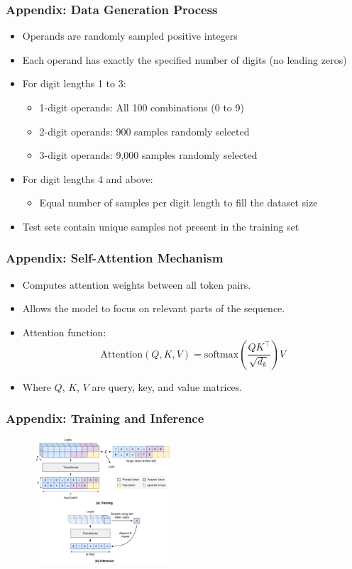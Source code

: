 \documentclass[14pt,aspectratio=169]{beamer}
\theoremstyle{remark}
\begin{document}
\begin{frame}
    \frametitle{Appendix: Data Generation Process}
    \begin{itemize}
        \item Operands are randomly sampled positive integers
        \item Each operand has exactly the specified number of digits (no leading zeros)
        \item For digit lengths 1 to 3:
              \begin{itemize}
                  \item 1-digit operands: All 100 combinations (0 to 9)
                  \item 2-digit operands: 900 samples randomly selected
                  \item 3-digit operands: 9,000 samples randomly selected
              \end{itemize}
        \item For digit lengths 4 and above:
              \begin{itemize}
                  \item Equal number of samples per digit length to fill the dataset size
              \end{itemize}
        \item Test sets contain unique samples not present in the training set
    \end{itemize}
\end{frame}

\begin{frame}
    \frametitle{Appendix: Self-Attention Mechanism}
    \begin{itemize}
        \item Computes attention weights between all token pairs.
        \item Allows the model to focus on relevant parts of the sequence.
        \item Attention function:
              \[
                  \text{Attention}(Q, K, V) = \text{softmax}\left( \frac{Q K^\top}{\sqrt{d_k}} \right) V
              \]
        \item Where $Q$, $K$, $V$ are query, key, and value matrices.
    \end{itemize}
\end{frame}

\begin{frame}
    \frametitle{Appendix: Training and Inference}
    \begin{figure}
        \centering
        \includegraphics[width=0.45\textwidth]{fig/training_and_inference.pdf}
    \end{figure}
\end{frame}
\end{document}
